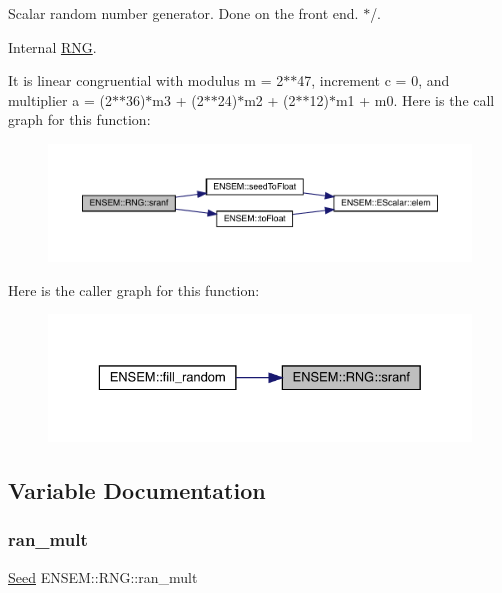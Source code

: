 Scalar random number generator. Done on the front end. $\ast$/. 

Internal \mbox{\hyperlink{namespaceENSEM_1_1RNG}{R\+NG}}.

It is linear congruential with modulus m = 2$\ast$$\ast$47, increment c = 0, and multiplier a = (2$\ast$$\ast$36)$\ast$m3 + (2$\ast$$\ast$24)$\ast$m2 + (2$\ast$$\ast$12)$\ast$m1 + m0. Here is the call graph for this function\+:\nopagebreak
\begin{figure}[H]
\begin{center}
\leavevmode
\includegraphics[width=350pt]{d8/d9c/namespaceENSEM_1_1RNG_a169ccd1627df1ad9983c4ce344d0e36a_cgraph}
\end{center}
\end{figure}
Here is the caller graph for this function\+:\nopagebreak
\begin{figure}[H]
\begin{center}
\leavevmode
\includegraphics[width=329pt]{d8/d9c/namespaceENSEM_1_1RNG_a169ccd1627df1ad9983c4ce344d0e36a_icgraph}
\end{center}
\end{figure}


\subsection{Variable Documentation}
\mbox{\label{namespaceENSEM_1_1RNG_a934549765fb4b894a8dafd77fb0aa3d1}} 
\subsubsection{\texorpdfstring{ran\_mult}{ran\_mult}}
{\footnotesize\ttfamily \mbox{\hyperlink{group__defs_ga8a5a983ab64ca8f6a5419885bacd4c40}{Seed}} E\+N\+S\+E\+M\+::\+R\+N\+G\+::ran\+\_\+mult}



